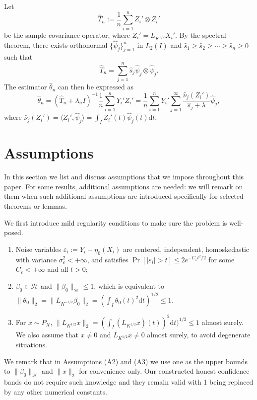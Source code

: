 \documentclass[11pt,a4paper]{article}
\renewcommand{\hat}{\widehat}
\theoremstyle{definition}
\theoremstyle{plain}
\theoremstyle{remark}
\newcommand{\ud}{\mathrm d}
\newcommand{\mH}{\mathcal H}
\begin{document}
Let
$$
\hat T_n := \frac{1}{n}\sum_{i=1}^n Z_i'\otimes Z_i'
$$
be the sample covariance operator, where $Z_i'=L_{K^{1/2}}X_i'$. By the spectral theorem, there exists orthonormal $\{\hat\psi_j\}_{j=1}^n$ in $L_2(I)$ and $\hat s_1\geq \hat s_2\geq\cdots\geq \hat s_n\geq 0$ such that
$$
\hat T_n = \sum_{j=1}^n \hat s_j\hat \psi_j\otimes\hat \psi_j.
$$
The estimator $\hat\theta_n$ can then be expressed as
\begin{equation}
\hat\theta_n = (\hat T_n+\lambda_n I)^{-1}\frac{1}{n}\sum_{i=1}^n Y_i'Z_i' = \frac{1}{n}\sum_{i=1}^n Y_i'\sum_{j=1}^{\infty}\frac{\hat\nu_j(Z_i')}{\hat s_j+\lambda}\hat\psi_j,
\label{eq:krr-nointercept-fpca}
\end{equation}
where $\hat\nu_j(Z_i') = \langle Z_i', \hat\psi_j\rangle=\int_I Z_i'(t)\hat\psi_j(t)\ud t$.

\section{Assumptions}

In this section we list and discuss assumptions that we impose throughout this paper. For some results, additional assumptions are needed: 
we will remark on them when such additional assumptions are introduced specifically for selected theorems or lemmas.

We first introduce mild regularity conditions to make sure the problem is well-posed.
\begin{enumerate}
\item[(A1)] Noise variables $\varepsilon_i:=Y_i-\eta_0(X_i)$ are centered, independent, homoskedastic with variance $\sigma_\varepsilon^2<+\infty$, and satisfies $\Pr[|\varepsilon_i|>t]\leq 2e^{-C_\varepsilon t^2/2}$
for some $C_\varepsilon<+\infty$ and all $t>0$;
\item[(A2)] $\beta_0\in\mH$ and $\|\beta_0\|_\mH\leq 1$, which is equivalent to $\|\theta_0\|_2=\|L_{K^{-1/2}}\beta_0\|_2 =(\int_I \theta_0(t)^2\ud t)^{1/2} \leq 1$.
\item[(A3)] For $x\sim P_X$, $\|L_{K^{1/2}}x\|_2= (\int_I (L_{K^{1/2}}x)(t))^2\ud t)^{1/2}\leq 1$ almost surely. We also assume that $x\neq 0$ and $L_{K^{1/2}}x\neq 0$ almost surely, to avoid degenerate situations.
\end{enumerate}

We remark that in Assumptions (A2) and (A3) we use one as the upper bounds to $\|\beta_0\|_\mH$ and $\|x\|_2$ for convenience only. Our constructed honest confidence bands do not require such knowledge
and they remain valid with 1 being replaced by any other numerical constants.
\end{document}
